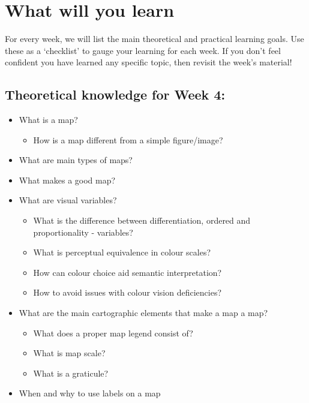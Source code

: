 \documentclass[
  letterpaper,
  DIV=11,
  numbers=noendperiod]{scrreprt}
\providecommand{\tightlist}{%
  \setlength{\itemsep}{0pt}\setlength{\parskip}{0pt}}\usepackage{longtable,booktabs,array}
\begin{document}
\section*{What will you learn}\label{what-will-you-learn-3}


For every week, we will list the main theoretical and practical learning
goals. Use these as a `checklist' to gauge your learning for each week.
If you don't feel confident you have learned any specific topic, then
revisit the week's material!

\subsection*{Theoretical knowledge for Week
4:}\label{theoretical-knowledge-for-week-4}

\begin{itemize}
\tightlist
\item
  What is a map?

  \begin{itemize}
  \tightlist
  \item
    How is a map different from a simple figure/image?
  \end{itemize}
\item
  What are main types of maps?
\item
  What makes a good map?
\item
  What are visual variables?

  \begin{itemize}
  \tightlist
  \item
    What is the difference between differentiation, ordered and
    proportionality - variables?
  \item
    What is perceptual equivalence in colour scales?
  \item
    How can colour choice aid semantic interpretation?
  \item
    How to avoid issues with colour vision deficiencies?
  \end{itemize}
\item
  What are the main cartographic elements that make a map a map?

  \begin{itemize}
  \tightlist
  \item
    What does a proper map legend consist of?
  \item
    What is map scale?
  \item
    What is a graticule?
  \end{itemize}
\item
  When and why to use labels on a map
\end{itemize}
\end{document}
